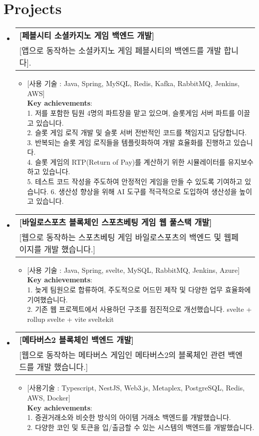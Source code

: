 \documentclass[letterpaper,11pt]{article}
\makeatletter
\newcommand{\resumeItem}[1]{
  \item\small{
    {#1 \vspace{-2pt}}
  }
}
\newcommand{\resumeProject}[2]{
  \vspace{-1pt}\item
    \begin{tabular*}{0.97\textwidth}[t]{l@{\extracolsep{\fill}}r}
      \textbf{#1} \\
      \small{#2} \\
    \end{tabular*}\vspace{-5pt}
}
\newcommand{\resumeSubHeadingListStart}{\begin{itemize}[leftmargin=*]}
\newcommand{\resumeSubHeadingListEnd}{\end{itemize}}
\newcommand{\resumeItemListStart}{\begin{itemize}}
\newcommand{\resumeItemListEnd}{\end{itemize}\vspace{-5pt}}
\makeatother
\begin{document}
\section{Projects}
  \resumeSubHeadingListStart
    \resumeProject
      {[페블시티 소셜카지노 게임 백엔드 개발]}
         {[앱으로 동작하는 소셜카지노 게임 페블시티의 백엔드를 개발 합니다].}
         \resumeItemListStart
             \resumeItem{[사용 기술 : Java, Spring, MySQL, Redis, Kafka, RabbitMQ, Jenkins, AWS] \\
             \textbf{Key achievements}: \\ 
             1. 저를 포함한 팀원 4명의 파트장을 맡고 있으며, 슬롯게임 서버 파트를 이끌고 있습니다. \\
             2. 슬롯 게임 로직 개발 및 슬롯 서버 전반적인 코드를 책임지고 담당합니다. \\
             3. 반복되는 슬롯 게임 로직들을 템플릿화하여 개발 효율화를 진행하고 있습니다. \\
             4. 슬롯 게임의 RTP(Return of Pay)를 계산하기 위한 시뮬레이터를 유지보수 하고 있습니다. \\
             5. 테스트 코드 작성을 주도하여 안정적인 게임을 만들 수 있도록 기여하고 있습니다.
             6. 생산성 향상을 위해 AI 도구를 적극적으로 도입하여 생산성을 높이고 있습니다. \\}
         \resumeItemListEnd
    
    \resumeProject
      {[바일로스포츠 블록체인 스포츠베팅 게임 웹 풀스택 개발]}
          {[웹으로 동작하는 스포츠베팅 게임 바일로스포츠의 백엔드 및 웹페이지를 개발 했습니다.]}
          \resumeItemListStart
            \resumeItem{[사용 기술 : Java, Spring, svelte, MySQL, RabbitMQ, Jenkins, Azure]} \\
            \textbf{Key achievements}: \\ 
                 1. 늦게 팀원으로 합류하여, 주도적으로 어드민 제작 및 다양한 업무 효율화에 기여했습니다. \\
                 2. 기존 웹 프로젝트에서 사용하던 구조를 점진적으로 개선했습니다.
                 svelte + rollup \longrightarrow svelte + vite \longrightarrow sveltekit \\
        \resumeItemListEnd

    \resumeProject
      {[메타버스2 블록체인 백엔드 개발]}
          {[웹으로 동작하는 메타버스 게임인 메타버스2의 블록체인 관련 백엔드를 개발 했습니다.]}
          \resumeItemListStart
            \resumeItem{[사용기술 : Typescript, NestJS, Web3.js, Metaplex, PostgreSQL, Redis, AWS, Docker]} \\
            \textbf{Key achievements}: \\ 
                 1. 증권거래소와 비슷한 방식의 아이템 거래소 백엔드를 개발했습니다. \\
                 2. 다양한 코인 및 토큰을 입/출금할 수 있는 시스템의 백엔드를 개발했습니다. \\
        \resumeItemListEnd
  \resumeSubHeadingListEnd
\end{document}
